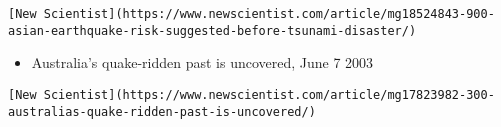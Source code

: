\documentclass[
]{article}
\providecommand{\tightlist}{%
  \setlength{\itemsep}{0pt}\setlength{\parskip}{0pt}}
\begin{document}
\begin{verbatim}
[New Scientist](https://www.newscientist.com/article/mg18524843-900-asian-earthquake-risk-suggested-before-tsunami-disaster/)
\end{verbatim}

\begin{itemize}
\tightlist
\item
  Australia's quake-ridden past is uncovered, June 7 2003
\end{itemize}

\begin{verbatim}
[New Scientist](https://www.newscientist.com/article/mg17823982-300-australias-quake-ridden-past-is-uncovered/)
\end{verbatim}
\end{document}
